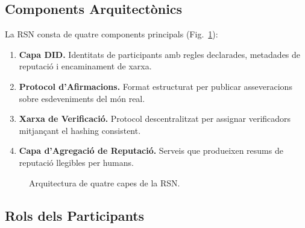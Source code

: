 \documentclass[11pt,a4paper,twocolumn]{article}
\begin{document}
\subsection{Components Arquitectònics}

La RSN consta de quatre components principals (Fig.~\ref{fig:architecture}):
\begin{enumerate}[nosep]
\item \textbf{Capa DID.} Identitats de participants amb regles declarades, metadades de reputació i encaminament de xarxa.
\item \textbf{Protocol d'Afirmacions.} Format estructurat per publicar asseveracions sobre esdeveniments del món real.
\item \textbf{Xarxa de Verificació.} Protocol descentralitzat per assignar verificadors mitjançant el hashing consistent.
\item \textbf{Capa d'Agregació de Reputació.} Serveis que produeixen resums de reputació llegibles per humans.
\end{enumerate}

\begin{figure}[ht]
\centering
{}
\caption{Arquitectura de quatre capes de la RSN.}
\label{fig:architecture}
\end{figure}

\subsection{Rols dels Participants}
\end{document}
